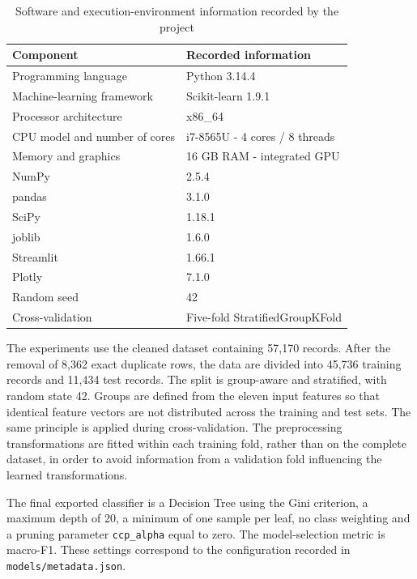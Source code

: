 \begin{table}[htbp]
  \centering
  \caption{Software and execution-environment information recorded by the project}
  \label{tab:experimental-environment}
  \small
  \begin{tabularx}{\linewidth}{|p{3.5cm}|X|}
    \hline
    \textbf{Component} & \textbf{Recorded information} \\
    \hline
    Programming language & Python 3.14.4 \\
    \hline
    Machine-learning framework & Scikit-learn 1.9.1 \\
    \hline
    Processor architecture & x86\_64 \\
    \hline
    CPU model and number of cores & i7-8565U - 4 cores / 8 threads \\
    \hline
    Memory and graphics & 16 GB RAM - integrated GPU \\
    \hline
    NumPy & 2.5.4 \\
    \hline
    pandas & 3.1.0 \\
    \hline
    SciPy & 1.18.1 \\
    \hline
    joblib & 1.6.0 \\
    \hline
    Streamlit & 1.66.1 \\
    \hline
    Plotly & 7.1.0 \\
    \hline
    Random seed & 42 \\
    \hline
    Cross-validation & Five-fold StratifiedGroupKFold \\
    \hline
  \end{tabularx}
\end{table}

The experiments use the cleaned dataset containing 57,170 records. After the removal of 8,362 exact duplicate rows, the data are divided into 45,736 training records and 11,434 test records. The split is group-aware and stratified, with random state 42. Groups are defined from the eleven input features so that identical feature vectors are not distributed across the training and test sets. The same principle is applied during cross-validation. The preprocessing transformations are fitted within each training fold, rather than on the complete dataset, in order to avoid information from a validation fold influencing the learned transformations.

The final exported classifier is a Decision Tree using the Gini criterion, a maximum depth of 20, a minimum of one sample per leaf, no class weighting and a pruning parameter \texttt{ccp\_alpha} equal to zero. The model-selection metric is macro-F1. These settings correspond to the configuration recorded in \texttt{models/metadata.json}.

